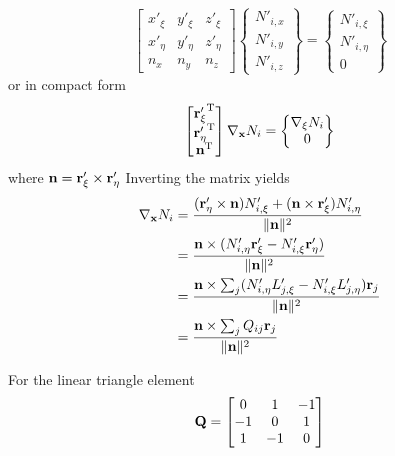 \documentclass{article}
\begin{document}
\begin{equation}
\begin{bmatrix}
x'_\xi & y'_\xi & z'_\xi \\
x'_\eta & y'_\eta & z'_\eta \\
n_x & n_y & n_z
\end{bmatrix}
\left\{\begin{matrix}
N'_{i,x} \\ N'_{i,y} \\ N'_{i,z}
\end{matrix}\right\}
=
\left\{\begin{matrix}
N'_{i,\xi} \\ N'_{i,\eta} \\ 0
\end{matrix}\right\}
\end{equation}
%
or in compact form
%
\begin{equation}
\begin{bmatrix}
{{\bf r}'_\xi}^{\mathrm{T}} \\
{{\bf r}'_\eta}^{\mathrm{T}} \\
{\bf n}^{\mathrm{T}}
\end{bmatrix}
\nabla_{\bf x} N_i
=
\left\{\begin{matrix}
\nabla_{\xi} N_i \\ 0
\end{matrix}\right\}
\end{equation}
%
where ${\bf n} = {\bf r}'_\xi \times {\bf r}'_\eta$
%
Inverting the matrix yields
%
\begin{align}
\nabla_{\bf x} N_i
&= \frac{({\bf r}'_\eta\times {\bf n})N'_{i,\xi} + ({\bf n}\times{\bf r}'_\xi)  N'_{i,\eta}}{\| {\bf n} \|^2} \\
&= \frac{{\bf n} \times (N'_{i,\eta}{\bf r}'_\xi - N'_{i,\xi} {\bf r}'_\eta)}{\| {\bf n} \|^2} \\
&= \frac{{\bf n} \times \sum_j (N'_{i,\eta}  L'_{j,\xi} - N'_{i,\xi} L'_{j,\eta}) {\bf r}_j }{\| {\bf n} \|^2} \\
&= \frac{{\bf n} \times \sum_j Q_{ij} {\bf r}_j }{\| {\bf n} \|^2}
\end{align}

For the linear triangle element
%
\begin{equation}
{\bf Q} = \begin{bmatrix}
0 & 1 & -1\\
-1 & 0 & 1\\
1 & -1 & 0
\end{bmatrix}
\end{equation}
\end{document}
